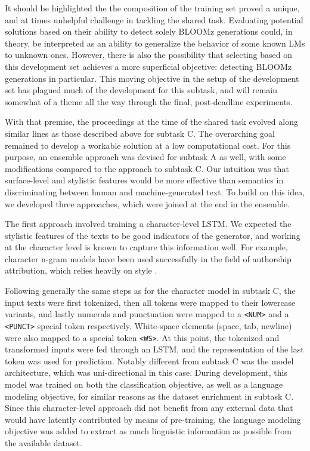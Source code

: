 It should be highlighted the the composition of the training set proved a unique, and at times unhelpful challenge in tackling the shared task.
Evaluating potential solutions based on their ability to detect solely BLOOMz generations could, in theory, be interpreted as an ability to generalize the behavior of some known LMs to unknown ones.
However, there is also the possibility that selecting based on this development set achieves a more superficial objective: detecting BLOOMz generations in particular.
This moving objective in the setup of the development set has plagued much of the development for this subtask, and will remain somewhat of a theme all the way through the final, post-deadline experiments.

With that premise, the proceedings at the time of the shared task evolved along similar lines as those described above for subtask C.
The overarching goal remained to develop a workable solution at a low computational cost.
For this purpose, an ensemble approach was devised for subtask A as well, with some modifications compared to the approach to subtask C.
Our intuition was that surface-level and stylistic features would be more effective than semantics in discriminating between human and machine-generated text. To build on this idea, we developed three approaches, which were joined at the end in the ensemble.

The first approach involved training a character-level LSTM. We expected the stylistic features of the texts to be good indicators of the generator, and working at the character level is known to capture this information well.
For example, character n-gram models have been used successfully in the field of authorship attribution, which relies heavily on style \citep{stamatatos2013robustness}.

Following generally the same steps as for the character model in subtask C, the input texts were first tokenized, then all tokens were mapped to their lowercase variants, and lastly numerals and punctuation were mapped to a \verb|<NUM>| and a \verb|<PUNCT>| special token respectively.
White-space elements (space, tab, newline) were also mapped to a special token \verb|<WS>|.
At this point, the tokenized and transformed inputs were fed through an LSTM, and the representation of the last token was used for prediction.
Notably different from subtask C was the model architecture, which was uni-directional in this case.
During development, this model was trained on both the classification objective, as well as a language modeling objective, for similar reasons as the dataset enrichment in subtask C.
Since this character-level approach did not benefit from any external data that would have latently contributed by means of pre-training, the language modeling objective was added to extract as much linguistic information as possible from the available dataset.

